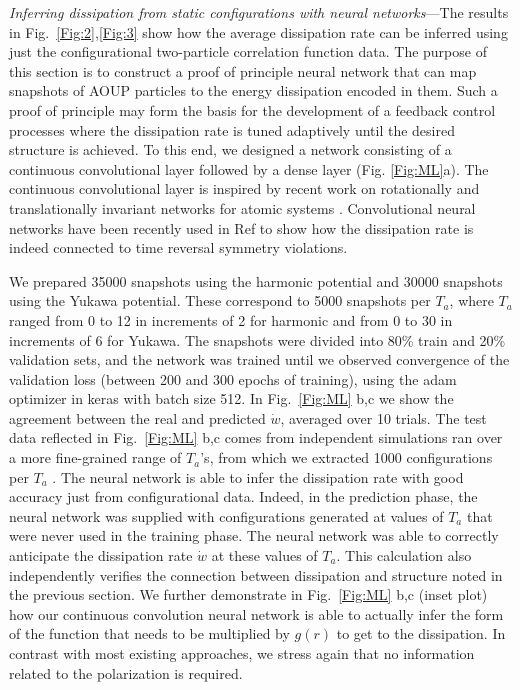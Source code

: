 \documentclass[superscriptaddress, twocolumn, prl, longbibliography, nofootinbib]{revtex4-1}
\begin{document}
{\it Inferring dissipation from static configurations with neural networks}---The results in Fig.~\ref{Fig:2},\ref{Fig:3} show how the average dissipation rate can be inferred using just the configurational two-particle correlation function data. The purpose of this section is to construct a proof of principle neural network that can map snapshots of AOUP particles to the energy dissipation encoded in them. Such a proof of principle may form the basis for the development of a feedback control processes where the dissipation rate is tuned adaptively until the desired structure is achieved. 
To this end,  we designed a network consisting of a continuous convolutional layer followed by a dense layer (Fig. \ref{Fig:ML}a). The continuous convolutional layer is inspired by recent work on rotationally and translationally invariant networks for atomic systems \cite{tess2018}. Convolutional neural networks have been recently used in Ref \cite{Seif2020} to show how the dissipation rate is indeed connected to time reversal symmetry violations. 

We prepared 35000 snapshots using the harmonic potential and 30000 snapshots using  the Yukawa potential. These correspond to 5000 snapshots per $T_a$, where $T_a$ ranged from 0 to 12 in increments of 2 for harmonic and from 0 to 30 in increments of 6 for Yukawa. The snapshots were divided into 80\% train and 20\% validation sets, and the network was trained until we observed convergence of the validation loss (between 200 and 300 epochs of training), using the adam optimizer in keras with batch size 512. In Fig.~\ref{Fig:ML} b,c we show the agreement between the real and predicted $\dot{w}$, averaged over 10 trials. The test data reflected in Fig.~\ref{Fig:ML} b,c comes from independent simulations ran over a more fine-grained range of $T_a$'s, from which we extracted 1000 configurations per $T_a$ . The neural network is able to infer the dissipation rate with good accuracy just from configurational data. Indeed, in the prediction phase, the neural network was supplied with configurations generated at values of $T_a$ that were never used in the training phase. The neural network was able to correctly anticipate the dissipation rate $\dot{w}$ at these values of $T_a$. This calculation also independently verifies the connection between dissipation and structure noted in the previous section. We further demonstrate in Fig.~\ref{Fig:ML} b,c (inset plot) how our continuous convolution neural network is able to actually infer the form of the function that needs to be multiplied by $g(r)$ to get to the dissipation. In contrast with most existing approaches, we stress again that no information related to the polarization is required.
\end{document}
